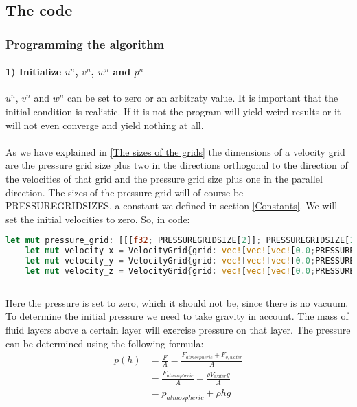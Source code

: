 \documentclass{article}
\begin{document}
\subsection{The code}
\subsubsection{Programming the algorithm}
\paragraph{1) Initialize \(u^n\), \(v^n\), \(w^n\) and \(p^n\)}
\(u^n\), \(v^n\) and \(w^n\) can be set to zero or an arbitraty value. It is important that the initial condition is realistic. If it is not the program will yield weird results or it will not even converge and yield nothing at all.
\\ \\
As we have explained in \ref{The sizes of the grids} the dimensions of a velocity grid are the pressure grid size plus two in the directions orthogonal to the direction of the velocities of that grid and the pressure grid size plus one in the parallel direction. The sizes of the pressure grid will of course be PRESSUREGRIDSIZES, a constant we defined in section \ref{Constants}. We will set the initial velocities to zero. So, in code:
\begin{lstlisting}[language=Rust, style=boxed, breaklines=true]
let mut pressure_grid: [[[f32; PRESSUREGRIDSIZE[2]]; PRESSUREGRIDSIZE[1]]; PRESSUREGRIDSIZE[0]]=[[[0.0; PRESSUREGRIDSIZE[2]]; PRESSUREGRIDSIZE[1]]; PRESSUREGRIDSIZE[0]];//pressureGrid[x][y][z] is the pressure at coordinates (x,y,z)
    let mut velocity_x = VelocityGrid{grid: vec![vec![vec![0.0;PRESSUREGRIDSIZE[2]+2]; PRESSUREGRIDSIZE[1]+2]; PRESSUREGRIDSIZE[0]+1], dimension:0};// z,y,x !!!
    let mut velocity_y = VelocityGrid{grid: vec![vec![vec![0.0;PRESSUREGRIDSIZE[2]+2]; PRESSUREGRIDSIZE[1]+1]; PRESSUREGRIDSIZE[0]+2], dimension:1}; 
    let mut velocity_z = VelocityGrid{grid: vec![vec![vec![0.0;PRESSUREGRIDSIZE[2]+1]; PRESSUREGRIDSIZE[1]+2]; PRESSUREGRIDSIZE[0]+2], dimension:2}; 
    
\end{lstlisting}
Here the pressure is set to zero, which it should not be, since there is no vacuum. To determine the initial pressure we need to take gravity in account. The mass of fluid layers above a certain layer will exercise pressure on that layer. The pressure can be determined using the following formula:
\[
\begin{split}
p(h)&=\frac{F}{A}=\frac{F_{atmospheric}+F_{g,water}}{A}
\\&=\frac{F_{atmospheric}}{A}+\frac{\rho V_{water}g}{A}
\\&=p_{atmospheric}+\rho hg
\end{split}
\]
\end{document}
